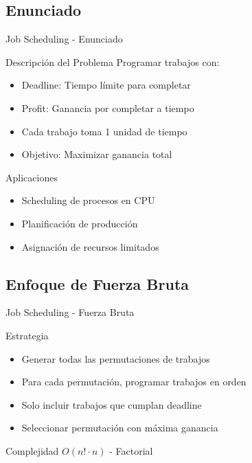 \documentclass[aspectratio=169]{beamer}
\begin{document}
\subsection{Enunciado}
\begin{frame}{Job Scheduling - Enunciado}
\begin{block}{Descripción del Problema}
Programar trabajos con:
\begin{itemize}
\item Deadline: Tiempo límite para completar
\item Profit: Ganancia por completar a tiempo
\item Cada trabajo toma 1 unidad de tiempo
\item Objetivo: Maximizar ganancia total
\end{itemize}
\end{block}

\begin{exampleblock}{Aplicaciones}
\begin{itemize}
\item Scheduling de procesos en CPU
\item Planificación de producción
\item Asignación de recursos limitados
\end{itemize}
\end{exampleblock}
\end{frame}

\subsection{Enfoque de Fuerza Bruta}
\begin{frame}{Job Scheduling - Fuerza Bruta}
\begin{block}{Estrategia}
\begin{itemize}
\item Generar todas las permutaciones de trabajos
\item Para cada permutación, programar trabajos en orden
\item Solo incluir trabajos que cumplan deadline
\item Seleccionar permutación con máxima ganancia
\end{itemize}
\end{block}

\begin{alertblock}{Complejidad}
$O(n! \cdot n)$ - Factorial
\end{alertblock}
\end{frame}
\end{document}
